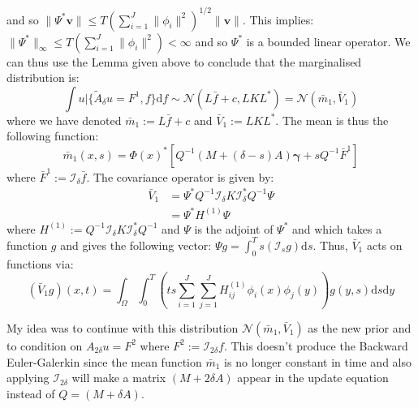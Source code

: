 \documentclass{article}
\theoremstyle{definition}
\theoremstyle{remark}
\theoremstyle{remark}
\begin{document}
and so $\|\Psi^{*}\boldsymbol{v}\|\leq T\left(\sum_{i=1}^{J}\|\phi_{i}\|^{2}\right)^{1/2}\|\boldsymbol{v}\|$. This implies: $\|\Psi^{*}\|_{\infty}\leq T\left(\sum_{i=1}^{J}\|\phi_{i}\|^{2}\right)<\infty$ and so $\Psi^{*}$ is a bounded linear operator. We can thus use the Lemma given above to conclude that the marginalised distribution is:
\begin{equation*}
    \int u|\{\tilde{A}_{\delta}u=F^{1},f\}\mathrm{d}f\sim\mathcal{N}(L\bar{f}+c,LKL^{*})=\mathcal{N}(\bar{m}_{1},\bar{V}_{1})
\end{equation*}
where we have denoted $\bar{m}_1:=L\bar{f}+c$ and $\bar{V}_{1}:=LKL^{*}$. The mean is thus the following function:
\begin{equation*}
    \bar{m}_{1}(x,s)=\Phi(x)^{*}[Q^{-1}(M+(\delta-s)A)\boldsymbol{\gamma}+sQ^{-1}\bar{F}^{1}]
\end{equation*}
where $\bar{F}^{1}:=\mathcal{I}_{\delta}\bar{f}$. The covariance operator is given by:
\begin{align*}
        \bar{V}_{1} &= \Psi^{*}Q^{-1}\mathcal{I}_{\delta}K\mathcal{I}_{\delta}^{*}Q^{-1}\Psi \\
        &= \Psi^{*}H^{(1)}\Psi
\end{align*}
where $H^{(1)}:=Q^{-1}\mathcal{I}_{\delta}K\mathcal{I}_{\delta}^{*}Q^{-1}$ and $\Psi$ is the adjoint of $\Psi^{*}$ and which takes a function $g$ and gives the following vector: $\Psi g=\int_{0}^{T}s(\mathcal{I}_{s}g)\mathrm{d}s$. Thus, $\bar{V}_{1}$ acts on functions via:
\begin{equation*}
    (\bar{V}_{1}g)(x,t)=\int_{\Omega}\int_{0}^{T}\left(ts\sum_{i=1}^{J}\sum_{j=1}^{J}H^{(1)}_{ij}\phi_{i}(x)\phi_{j}(y)\right)g(y,s)\mathrm{d}s\mathrm{d}y
\end{equation*}

My idea was to continue with this distribution $\mathcal{N}(\bar{m}_1,\bar{V}_1)$ as the new prior and to condition on $A_{2\delta}u=F^{2}$ where $F^2:=\mathcal{I}_{2\delta}f$. This doesn't produce the Backward Euler-Galerkin since the mean function $\bar{m}_1$ is no longer constant in time and also applying $\mathcal{I}_{2\delta}$ will make a matrix $(M+2\delta A)$ appear in the update equation instead of $Q=(M+\delta A)$.
\end{document}
